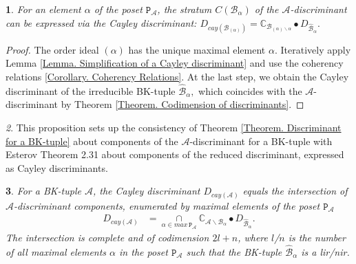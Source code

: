 \documentclass[11pt]{article}
\theoremstyle{plain}
\newtheorem{thm}{\protect\theoremname}[section]
\theoremstyle{definition}
\theoremstyle{remark}
\newtheorem{rem}[thm]{\protect\remarkname}
\theoremstyle{plain}
\theoremstyle{plain}
\newtheorem{prop}[thm]{\protect\propositionname}
\theoremstyle{plain}
\theoremstyle{definition}
\providecommand{\propositionname}{Proposition}
\providecommand{\remarkname}{Remark}
\providecommand{\theoremname}{Theorem}
\begin{document}
\begin{prop}
\label{Proposition. Discriminant's strata are Cayley discriminants}For
an element $\alpha$ of the poset $\mathtt{P}_{\mathscr{A}}$, the
stratum $C(\mathscr{B}_{\alpha})$ of the $\mathscr{A}$-discriminant
can be expressed via the Cayley discriminant: $D_{cay(\mathscr{B}_{(\alpha)})}=\mathbb{C}_{\mathscr{B}_{(\alpha)\backslash\alpha}}\bullet D_{\hat{\mathscr{B}}_{\alpha}}.$
\end{prop}

\begin{proof}
The order ideal $(\alpha)$ has the unique maximal element $\alpha.$
Iteratively apply Lemma \ref{Lemma. Simplification of a Cayley discriminant}
and use the coherency relations \ref{Corollary. Coherency Relations}.
At the last step, we obtain the Cayley discriminant of the irreducible
BK-tuple $\hat{\mathscr{B}}_{\alpha},$ which coincides with the $\mathscr{A}$-discriminant
by Theorem \ref{Theorem. Codimension of discriminants}.
\end{proof}
\begin{rem}
This proposition sets up the consistency of Theorem \ref{Theorem. Discriminant for a BK-tuple}
about components of the $\mathscr{A}$-discriminant for a BK-tuple
with Esterov Theorem 2.31 \cite{esterov_newton_2010} about components
of the reduced discriminant, expressed as Cayley discriminants.
\end{rem}

\begin{thm}
\label{Theorem. Cayley Discriminants}For a BK-tuple $\mathscr{A}$,
the Cayley discriminant $D_{cay(\mathscr{A})}$ equals the intersection
of $\mathscr{A}$-discriminant components, enumerated by maximal elements
of the poset $\mathtt{P}_{\mathscr{A}}$
\begin{align*}
D_{cay(\mathscr{A})} & =\underset{\alpha\in max\,\mathtt{P}_{\mathscr{A}}}{\cap}\mathbb{C}_{\mathscr{\mathscr{A}}\backslash\mathscr{B}_{\alpha}}\bullet D_{\hat{\mathscr{B}}_{\alpha}}.
\end{align*}
The intersection is complete and of codimension $2l+n$, where $l$/$n$
is the number of all maximal elements $\alpha$ in the poset $\mathtt{P}_{\mathscr{A}}$
such that the BK-tuple $\hat{\mathscr{B}}_{\alpha}$ is a lir/nir.
\end{thm}
\end{document}
